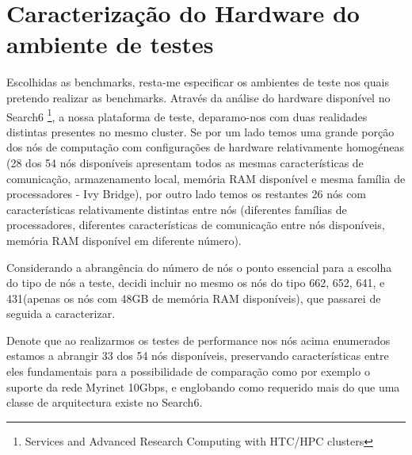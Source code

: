 \documentclass[conference,compsoc]{IEEEtran}
\begin{document}
\section{Caracterização do Hardware do ambiente de testes}
Escolhidas as benchmarks, resta-me especificar os ambientes de teste nos quais pretendo realizar as benchmarks. Através da análise do hardware disponível no Search6 \footnote{Services and Advanced Research Computing with HTC/HPC clusters}, a nossa plataforma de teste, deparamo-nos com duas 
realidades distintas presentes no mesmo cluster. Se por um lado temos uma grande porção dos nós de computação com configurações de hardware relativamente homogéneas (28 dos 54 nós disponíveis apresentam todos as mesmas características de comunicação, armazenamento local, memória RAM disponível e mesma família de processadores - Ivy Bridge), por outro lado temos os restantes 26 nós com características relativamente distintas entre nós (diferentes famílias de processadores, diferentes características de comunicação entre nós disponíveis, memória RAM disponível em diferente número). \par 
Considerando a abrangência do número de nós o ponto essencial para a escolha do tipo de nós a teste, decidi incluir no mesmo os nós do tipo 662, 652, 641, e 431(apenas os nós com 48GB de memória RAM disponíveis), que passarei de seguida a caracterizar. \par 
Denote que ao realizarmos os testes de performance nos nós acima enumerados estamos a abrangir 33 dos 54 nós disponíveis, preservando características entre eles fundamentais para a possibilidade de comparação como por exemplo o suporte da rede Myrinet 10Gbps, e englobando como requerido mais do que uma classe de arquitectura existe no Search6.\par 
\end{document}
